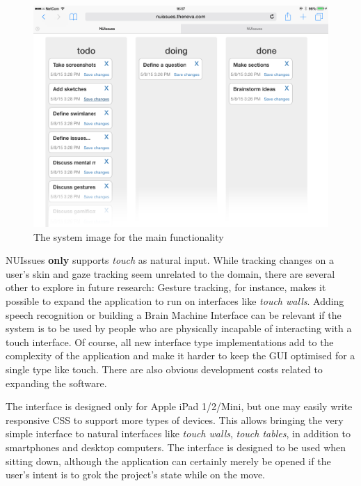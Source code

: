 \begin{figure}[H]
    \centerline{\includegraphics[scale=0.4]{images/nuissues-screenshots/01-default-all-swimlanes}}
    \caption{The system image for the main functionality}
    \label{figure:ipad-default-simple-screenshots}  
\end{figure}

NUIssues \textbf{only} supports \textit{touch} as natural input. While tracking changes on a user's skin and gaze tracking seem unrelated to the domain, there are several other to explore in future research: Gesture tracking, for instance, makes it possible to expand the application to run on interfaces like \textit{touch walls}. Adding speech recognition or building a Brain Machine Interface can be relevant if the system is to be used by people who are physically incapable of interacting with a touch interface. Of course, all new interface type implementations add to the complexity of the application and make it harder to keep the GUI optimised for a single type like touch. There are also obvious development costs related to expanding the software.

The interface is designed only for Apple iPad 1/2/Mini, but one may easily write responsive CSS to support more types of devices. This allows bringing the very simple interface to natural interfaces like \textit{touch walls}, \textit{touch tables}, in addition to smartphones and desktop computers. The interface is designed to be used when sitting down, although the application can certainly merely be opened if the user's intent is to grok the project's state while on the move.

